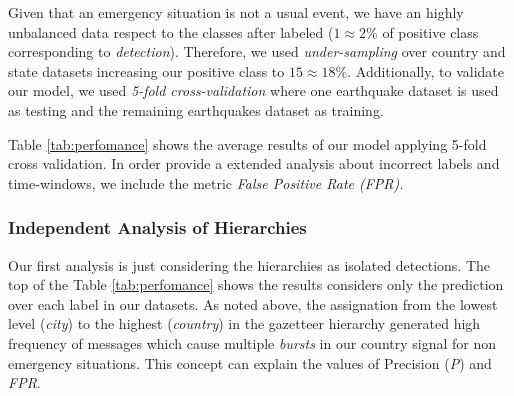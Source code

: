 \documentclass[sigconf]{acmart}
\begin{document}
Given that an emergency situation is not a usual event, we have an highly unbalanced data respect to the classes after labeled ($1\approx2\%$ of positive class corresponding to \textit{detection}). Therefore, we used \textit{under-sampling} \cite{lunardon2014rose} over country and state datasets increasing our positive class to $15\approx18\%$. Additionally, to validate our model, we used \textit{5-fold cross-validation} where one earthquake dataset is used as testing and the remaining earthquakes dataset as training.

Table \ref{tab:perfomance} shows the average results of our model applying 5-fold cross validation. In order provide a extended analysis about incorrect labels and time-windows, we include the metric \textit{False Positive Rate (FPR).} 


\subsubsection{Independent Analysis of Hierarchies} 
Our first analysis is just considering the hierarchies as isolated detections. The top of the Table \ref{tab:perfomance} shows the results considers only the prediction over each label in our datasets. As noted above, the assignation from the lowest level (\textit{city}) to the highest (\textit{country}) in the gazetteer hierarchy generated high frequency of messages which cause multiple \textit{bursts} in our country signal for non  emergency situations. This concept can explain the values of Precision (\textit{P}) and \textit{FPR}.
\end{document}
